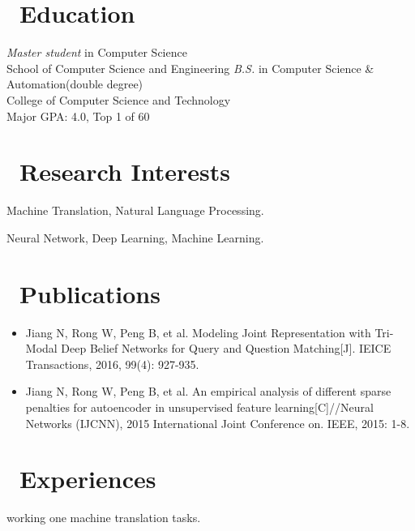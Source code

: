 \documentclass{resume}
\begin{document}



\section{\faGraduationCap\ Education}
\textit{Master student} in Computer Science \\
School of Computer Science and Engineering
\textit{B.S.} in Computer Science \& Automation(double degree)\\
College of Computer Science and Technology\\
Major GPA: 4.0, Top 1 of 60

\section{\faLightbulbO\ Research Interests}
Machine Translation, Natural Language Processing.

Neural Network, Deep Learning, Machine Learning.

\section{\faBook\ Publications}
\begin{itemize}[parsep=0.5ex]
\item Jiang N, Rong W, Peng B, et al. Modeling Joint Representation with Tri-Modal Deep Belief Networks for Query and Question Matching[J]. IEICE Transactions, 2016, 99(4): 927-935.

\item Jiang N, Rong W, Peng B, et al. An empirical analysis of different sparse penalties for autoencoder in unsupervised feature learning[C]//Neural Networks (IJCNN), 2015 International Joint Conference on. IEEE, 2015: 1-8.
\end{itemize}
\section{\faUsers\ Experiences}
working one machine translation tasks.
\end{document}
